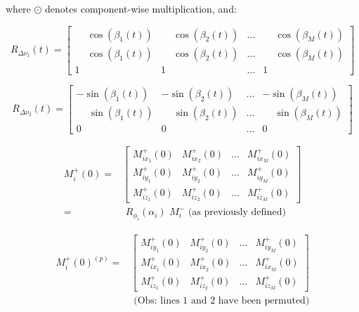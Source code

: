 where $\odot$ denotes component-wise multiplication, and:

\begin{equation}
    R_{\Delta \nu_1}(t)  = \begin{bmatrix} \phantom{-}\cos(\beta_{1}(t) ) & \phantom{-}\cos(\beta_{2}(t) ) & \dots & \phantom{-}\cos(\beta_{M}(t) ) \\
    \phantom{-}\cos(\beta_{1}(t) ) & \phantom{-}\cos(\beta_{2}(t) ) & \dots & \phantom{-}\cos(\beta_{M}(t) ) \\
    1    &        1   & \dots &  1
    \end{bmatrix}
\end{equation}

\begin{equation}
    R_{\Delta \nu_2}(t)  = \begin{bmatrix} -\sin(\beta_{1}(t) ) & -\sin(\beta_{2}(t) ) & \dots & -\sin(\beta_{M}(t) ) \\
    \phantom{-}\sin(\beta_{1}(t) ) & \phantom{-}\sin(\beta_{2}(t) ) & \dots & \phantom{-}\sin(\beta_{M}(t) ) \\
    0     &      0      & \dots &      0
    \end{bmatrix}
\end{equation}

\begin{equation}
\begin{split}
    M^{+}_i(0) = &
    \begin{bmatrix}
        M^{+}_{ix_1}(0) & M^{+}_{ix_2}(0) & \dots & M^{+}_{ix_M}(0) \\
        M^{+}_{iy_1}(0) & M^{+}_{iy_2}(0) & \dots & M^{+}_{iy_M}(0) \\
        M^{+}_{iz_1}(0) & M^{+}_{iz_2}(0) & \dots & M^{+}_{iz_M}(0)
    \end{bmatrix} \\
    = & \, \, R_{\phi_i}(\alpha_i) \, \, M^{-}_i \text{ (as previously defined)}
\end{split}
\end{equation}

\begin{equation}
\begin{split}
    M^{+}_i(0)^{(p)} = &
    \begin{bmatrix}
        M^{+}_{iy_1}(0) & M^{+}_{iy_2}(0) & \dots & M^{+}_{iy_M}(0) \\
        M^{+}_{ix_1}(0) & M^{+}_{ix_2}(0) & \dots & M^{+}_{ix_M}(0) \\
        M^{+}_{iz_1}(0) & M^{+}_{iz_2}(0) & \dots & M^{+}_{iz_M}(0)
    \end{bmatrix} \\
    & \text{ (Obs: lines 1 and 2 have been permuted)}
\end{split}
\end{equation}


